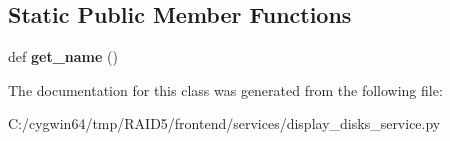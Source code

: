 \subsection*{Static Public Member Functions}
\begin{DoxyCompactItemize}
\item 
\mbox{\label{class_r_a_i_d5_1_1frontend_1_1services_1_1display__disks__service_1_1_display_disks_service_a9c193a3f90fa22c4b1cc465608e0e7ec}} 
def {\bfseries get\+\_\+name} ()
\end{DoxyCompactItemize}


The documentation for this class was generated from the following file\+:\begin{DoxyCompactItemize}
\item 
C\+:/cygwin64/tmp/\+R\+A\+I\+D5/frontend/services/display\+\_\+disks\+\_\+service.\+py\end{DoxyCompactItemize}

